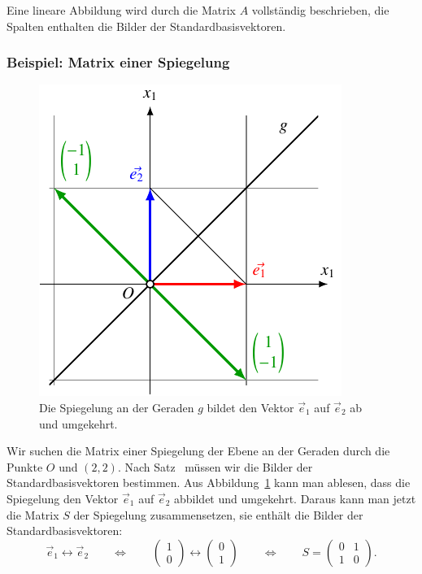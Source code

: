 \begin{satz}
\label{satz:affin:bilderderstandardbasisvektoren}
Eine lineare Abbildung wird durch die Matrix $A$ vollständig beschrieben,
die Spalten enthalten die Bilder der Standardbasisvektoren.
\end{satz}

\subsubsection{Beispiel: Matrix einer Spiegelung}
\begin{figure}
\centering
\includegraphics{3/images/spiegelung.pdf}
\caption{Die Spiegelung an der Geraden $g$ bildet den Vektor
$\vec{e}_1$ auf $\vec{e}_2$ ab und umgekehrt.
\label{skript:affin:spiegelung}}
\end{figure}
Wir suchen die Matrix einer Spiegelung der Ebene an der Geraden durch
die Punkte $O$ und $(2,2)$.
Nach Satz~\label{satz:affin:bilderderstandardbasisvektoren} müssen wir 
die Bilder der Standardbasisvektoren bestimmen.
Aus Abbildung~\ref{skript:affin:spiegelung} kann man ablesen, dass die
Spiegelung den Vektor $\vec{e}_1$ auf $\vec{e}_2$ abbildet und umgekehrt.
Daraus kann man jetzt die Matrix $S$ der Spiegelung zusammensetzen,
sie enthält die Bilder der Standardbasisvektoren:
\[
\vec{e}_1\leftrightarrow\vec{e}_2
\qquad\Leftrightarrow\qquad
\begin{pmatrix}1\\0\end{pmatrix}
\leftrightarrow
\begin{pmatrix}0\\1\end{pmatrix}
\qquad\Leftrightarrow\qquad
S
=
\begin{pmatrix}0&1\\1&0\end{pmatrix}.
\]
